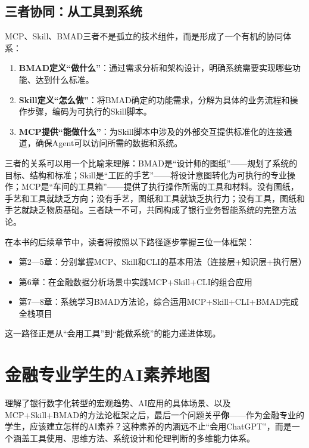 \subsection{三者协同：从工具到系统}

MCP、Skill、BMAD三者不是孤立的技术组件，而是形成了一个有机的协同体系：

\begin{enumerate}[leftmargin=2em]
  \item \textbf{BMAD定义``做什么''}：通过需求分析和架构设计，明确系统需要实现哪些功能、达到什么标准。
  \item \textbf{Skill定义``怎么做''}：将BMAD确定的功能需求，分解为具体的业务流程和操作步骤，编码为可执行的Skill脚本。
  \item \textbf{MCP提供``能做什么''}：为Skill脚本中涉及的外部交互提供标准化的连接通道，确保Agent可以访问所需的数据和系统。
\end{enumerate}

三者的关系可以用一个比喻来理解：BMAD是``设计师的图纸''——规划了系统的目标、结构和标准；Skill是``工匠的手艺''——将设计意图转化为可执行的专业操作；MCP是``车间的工具箱''——提供了执行操作所需的工具和材料。没有图纸，手艺和工具就缺乏方向；没有手艺，图纸和工具就缺乏执行力；没有工具，图纸和手艺就缺乏物质基础。三者缺一不可，共同构成了银行业务智能系统的完整方法论。

\begin{notebox}[本书的实践路径]
在本书的后续章节中，读者将按照以下路径逐步掌握三位一体框架：
\begin{itemize}[leftmargin=1.5em]
  \item 第2—5章：分别掌握MCP、Skill和CLI的基本用法（连接层+知识层+执行层）
  \item 第6章：在金融数据分析场景中实践MCP+Skill+CLI的组合应用
  \item 第7—8章：系统学习BMAD方法论，综合运用MCP+Skill+CLI+BMAD完成全栈项目
\end{itemize}
这一路径正是从``会用工具''到``能做系统''的能力递进体现。
\end{notebox}


\section{金融专业学生的AI素养地图}

理解了银行数字化转型的宏观趋势、AI应用的具体场景、以及MCP+Skill+BMAD的方法论框架之后，最后一个问题关乎\textbf{你}——作为金融专业的学生，应该建立怎样的AI素养？这种素养的内涵远不止``会用ChatGPT''，而是一个涵盖工具使用、思维方法、系统设计和伦理判断的多维能力体系。

